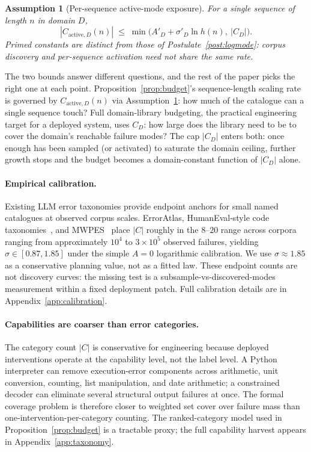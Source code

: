 \documentclass{article}
\theoremstyle{taeplain}
\theoremstyle{taedefn}
\newtheorem{assumption}[definition]{Assumption}
\newcommand{\teApprox}{\ensuremath{\approx}}
\begin{document}
\begin{assumption}[Per-sequence active-mode exposure]\label{ass:active}
For a single sequence of length $n$ in domain $D$,
\[
|C_{\text{active},D}(n)| \;\leq\; \min\bigl(A'_D + \sigma'_D \ln h(n),\ |C_D|\bigr).
\]
Primed constants are distinct from those of Postulate~\ref{post:logmode}: corpus discovery and per-sequence activation need not share the same rate.
\end{assumption}

The two bounds answer different questions, and the rest of the paper picks the right one at each point. Proposition~\ref{prop:budget}'s sequence-length scaling rate is governed by $C_{\text{active},D}(n)$ via Assumption~\ref{ass:active}: how much of the catalogue can a single sequence touch? Full domain-library budgeting, the practical engineering target for a deployed system, uses $C_D$: how large does the library need to be to cover the domain's reachable failure modes? The cap $|C_D|$ enters both: once enough has been sampled (or activated) to saturate the domain ceiling, further growth stops and the budget becomes a domain-constant function of $|C_D|$ alone.

\paragraph{Empirical calibration.}
Existing LLM error taxonomies provide endpoint anchors for small named catalogues at observed corpus scales. ErrorAtlas, HumanEval-style code taxonomies~\citep{wen2024fixing}, and MWPES~\citep{sun2025mwpes} place $|C|$ roughly in the $8$--$20$ range across corpora ranging from approximately $10^4$ to $3 \times 10^5$ observed failures, yielding $\sigma \in [0.87, 1.85]$ under the simple $A=0$ logarithmic calibration. We use $\sigma \teApprox 1.85$ as a conservative planning value, not as a fitted law. These endpoint counts are not discovery curves: the missing test is a subsample-vs-discovered-modes measurement within a fixed deployment patch. Full calibration details are in Appendix~\ref{app:calibration}.

\paragraph{Capabilities are coarser than error categories.}
The category count $|C|$ is conservative for engineering because deployed interventions operate at the capability level, not the label level. A Python interpreter can remove execution-error components across arithmetic, unit conversion, counting, list manipulation, and date arithmetic; a constrained decoder can eliminate several structural output failures at once. The formal coverage problem is therefore closer to weighted set cover over failure mass than one-intervention-per-category counting. The ranked-category model used in Proposition~\ref{prop:budget} is a tractable proxy; the full capability harvest appears in Appendix~\ref{app:taxonomy}.
\end{document}
